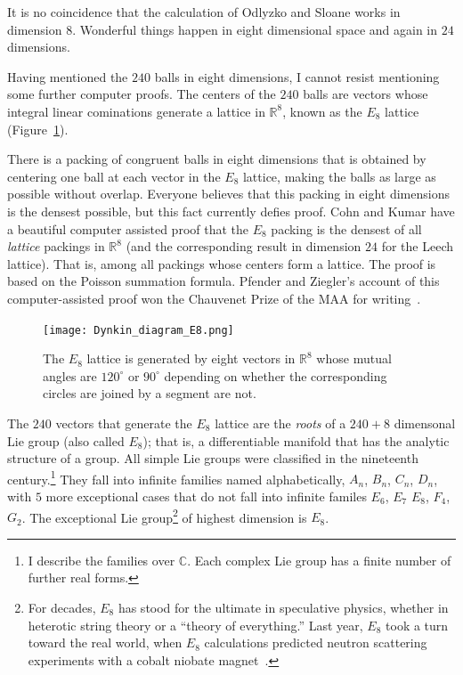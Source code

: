\documentclass{llncs}
\newcommand{\ring}[1]{\mathbb{#1}}
\begin{document}
It is no coincidence that the calculation of Odlyzko and Sloane works
in dimension $8$.  Wonderful things happen in eight dimensional space
and again in $24$ dimensions.

Having mentioned the $240$ balls in eight dimensions, I cannot resist
mentioning some further computer proofs.  The centers of the $240$ balls
are vectors whose integral linear cominations generate 
a lattice in $\ring{R}^8$, known as the $E_8$ lattice (Figure~\ref{fig:e8}).

There is a packing of congruent balls in eight dimensions that is
obtained by centering one ball at each vector in the $E_8$ lattice,
making the balls as large as possible without overlap.  Everyone
believes that this packing in eight dimensions is the densest
possible, but this fact currently defies proof.  Cohn and Kumar have a beautiful
computer assisted proof that the $E_8$ packing is the densest of all
{\it lattice} packings in $\ring{R}^8$ (and the corresponding result in
dimension $24$ for the Leech lattice).  That is, among all packings
whose centers form a lattice.  The proof is based on the Poisson
summation formula.  Pfender and Ziegler's account of this
computer-assisted proof won the Chauvenet Prize of the MAA for
writing~\cite{PZ}.


\begin{figure}[h!]
  \centering
\texttt{[image: Dynkin\_diagram\_E8.png]}
  \caption{The $E_8$ lattice is generated by eight vectors in $\ring{R}^8$ whose
mutual angles are $120^\circ$ or $90^\circ$ depending on whether the corresponding
circles are joined by a segment are not.}
\label{fig:e8}
\end{figure}

The $240$ vectors that generate the $E_8$ lattice are the {\it roots}
of a $240+8$ dimensonal Lie group (also called $E_8$); that is, a
differentiable manifold that has the analytic structure of a group.
All simple Lie groups were classified in the nineteenth
century.\footnote{I describe the families over $\ring{C}$.  Each
  complex Lie group has a finite number of further real forms.}  They
fall into infinite families named alphabetically, $A_n$, $B_n$, $C_n$,
$D_n$, with $5$ more exceptional cases that do not fall into infinite
familes $E_6$, $E_7$ $E_8$, $F_4$, $G_2$.  The exceptional Lie
group\footnote{For decades, $E_8$ has stood for the ultimate in
  speculative physics, whether in heterotic string theory or a
  ``theory of everything.''  Last year, $E_8$ took a turn toward the
  real world, when $E_8$ calculations predicted neutron scattering
  experiments with a cobalt niobate magnet~\cite{BGE8}.} of highest
dimension is $E_8$.
\end{document}
